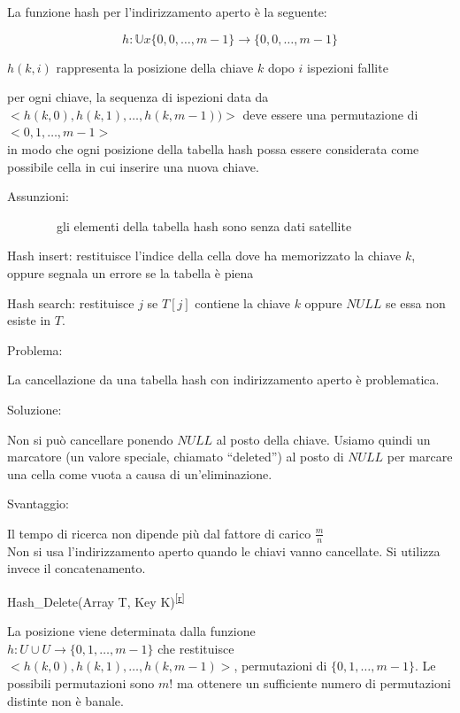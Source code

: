 \documentclass[tikz]{article}
\begin{document}
{La funzione hash per l'indirizzamento aperto è la seguente:}

\begin{equation}
h:\mathbb{U}x\{0,0,\ldots,m-1\} \rightarrow \{0,0,\ldots,m-1\}
\end{equation}

{$h(k,i)$ rappresenta la posizione della chiave $k$ dopo $i$ ispezioni fallite}

{per ogni chiave, la sequenza di ispezioni data da \\
$<h(k,0),h(k,1),\ldots,h(k,m-1))>$ deve essere una permutazione di $<0,1,\ldots,m-1>$ \\ in modo che ogni posizione della tabella hash possa essere considerata come possibile cella in cui inserire una nuova chiave.}

{Assunzioni:}

{~~~~~~~~gli elementi della tabella hash sono senza dati satellite}

{Hash insert: restituisce l'indice della cella dove ha memorizzato la chiave $k$, oppure segnala un errore se la tabella è piena}



{Hash search: restituisce $j$ se $T[j]$ contiene la chiave $k$ oppure $NULL$ se essa non esiste in $T$.}



{Problema:}

{La cancellazione da una tabella hash con indirizzamento aperto è problematica. }

{Soluzione:}

{Non si può cancellare ponendo $NULL$ al posto della chiave. Usiamo quindi un marcatore (un valore speciale, chiamato ``deleted'') al posto di $NULL$ per marcare una cella come vuota a causa di un'eliminazione.}

{Svantaggio:}

{Il tempo di ricerca non dipende più dal fattore di carico $\frac{m}{n}$}\\
{Non si usa l'indirizzamento aperto quando le chiavi vanno cancellate.
Si utilizza invece il concatenamento.}

{Hash\_Delete(Array T, Key
K)}\textsuperscript{\protect\hyperlink{cmnt18}{{[}r{]}}}

{La posizione viene determinata dalla funzione \\ $h:U\cup U\rightarrow \{0,1,\ldots,m-1\}$ che restituisce \\ $<h(k,0),h(k,1),\ldots,h(k,m-1)>$, permutazioni di $\{0,1,\ldots,m-1\}$. Le possibili permutazioni sono $m!$ ma ottenere un sufficiente numero di permutazioni distinte non è banale.}
\end{document}
